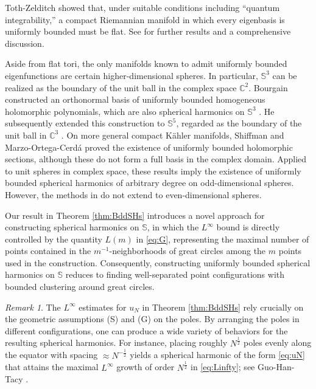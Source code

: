 \documentclass[12pt,reqno]{amsart}
\newcommand{\C}{\mathbb{C}}
\newcommand{\Sb}{\mathbb{S}}
\theoremstyle{plain}
\theoremstyle{definition}
\theoremstyle{remark}
\newtheorem*{rmk}{Remark}
\numberwithin{equation}{section}
\begin{document}
Toth-Zelditch \cite{TZ} showed that, under suitable conditions including ``quantum integrability,'' a compact Riemannian manifold in which every eigenbasis is uniformly bounded must be flat. See \cite{TZ} for further results and a comprehensive discussion.

Aside from flat tori, the only manifolds known to admit uniformly bounded eigenfunctions are certain higher-dimensional spheres. In particular, $\Sb^3$ can be realized as the boundary of the unit ball in the complex space $\C^2$. Bourgain constructed an orthonormal basis of uniformly bounded homogeneous holomorphic polynomials, which are also spherical harmonics on $\Sb^3$ \cite{Bo1}. He subsequently extended this construction to $\Sb^5$, regarded as the boundary of the unit ball in $\C^3$ \cite{Bo2}. On more general compact K\"ahler manifolds, Shiffman \cite{Shi} and Marzo-Ortega-Cerd\'a \cite{MOC} proved the existence of uniformly bounded holomorphic sections, although these do not form a full basis in the complex domain. Applied to unit spheres in complex space, these results imply the existence of uniformly bounded spherical harmonics of arbitrary degree on odd-dimensional spheres. However, the methods in \cite{Bo1, Shi, Bo2, MOC} do not extend to even-dimensional spheres.

Our result in Theorem \ref{thm:BddSHs} introduces a novel approach for constructing spherical harmonics on $\Sb$, in which the $L^\infty$ bound is directly controlled by the quantity $L(m)$ in \eqref{eq:G}, representing the maximal number of points contained in the $m^{-1}$-neighborhoods of great circles among the $m$ points used in the construction. Consequently, constructing uniformly bounded spherical harmonics on $\Sb$ reduces to finding well-separated point configurations with bounded clustering around great circles.

\begin{rmk}
The $L^\infty$ estimates for $u_N$ in Theorem \ref{thm:BddSHs} rely crucially on the geometric assumptions (S) and (G) on the poles. By arranging the poles in different configurations, one can produce a wide variety of behaviors for the resulting spherical harmonics. For instance, placing roughly $N^{\frac12}$ poles evenly along the equator with spacing $\approx N^{-\frac12}$ yields a spherical harmonic of the form \eqref{eq:uN} that attains the maximal $L^\infty$ growth of order $N^{\frac12}$ in \eqref{eq:Linfty}; see Guo-Han-Tacy \cite[Section 4.2]{GHT}.
\end{rmk}
\end{document}
